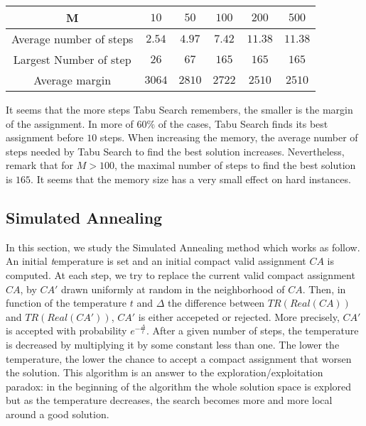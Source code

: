 \begin{center}
\begin{tabular}{ |c|c|c|c|c|c| }
\hline
    M & $10$&$50$& $100$& $200$& $500$\\
    \hline
    Average number of steps & $2.54$ & $4.97$& $7.42$& $11.38$ & $11.38$\\
    \hline
    Largest Number of step & $26$ & $67$& $165$& $165$ & $165$\\
    \hline
     Average margin & $3064$ & $2810$& $2722$& $2510$ & $2510$\\
    \hline
 \end{tabular}
\end{center}

It seems that the more steps Tabu Search remembers, the smaller is the margin of the assignment.
In more of $60\%$ of the cases, Tabu Search finds its best assignment before $10$ steps. When increasing the memory, the average number of steps needed by Tabu Search to find the best solution increases. Nevertheless, remark that for $M > 100$, the maximal number of steps to find the best solution is $165$. It seems that the memory size has a very small effect on  hard instances.


\subsection{Simulated Annealing}\label{sec:recuit}



In this section, we study the Simulated Annealing method which works as follow.  An initial {\emph temperature} is set and an initial compact valid assignment $CA$ is computed. At each step, we try to replace the current valid compact assignment $CA$, by $CA'$ drawn uniformly at random in the neighborhood of $CA$. Then, in function of the temperature $t$ and $\Delta$ the difference between $TR(Real(CA))$ and $TR(Real(CA'))$, $CA'$ is either accepeted or rejected. More precisely, 
$CA'$ is accepted with probability $e^{-\frac{\Delta}{t}}$. 
After a given number of steps, the temperature is decreased by multiplying it by some constant less than one. The lower the temperature, the lower the chance to accept a compact assignment that worsen the solution. This algorithm is an answer to the exploration/exploitation paradox: in the beginning of the algorithm the whole solution space is explored but as the temperature decreases, the search becomes more and more local around a good solution.


